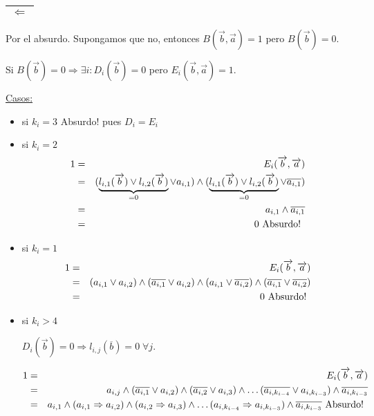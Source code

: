 \documentclass[12pt,a4paper]{report}
\begin{document}
			\vspace{5mm}
			\begin{tabular}{|c|} \hline $\Leftarrow$ \\\hline \end{tabular}
				\par Por el absurdo. Supongamos que no, entonces $B(\overrightarrow{b}, \overrightarrow{a}) = 1$ pero $B(\overrightarrow{b}) = 0$.
				\par Si $B(\overrightarrow{b}) = 0 \Rightarrow \exists i : D_{i}(\overrightarrow{b}) = 0$ pero $E_{i}(\overrightarrow{b}, \overrightarrow{a}) = 1$.

				\vspace{3mm}
				\underline{Casos:}
					\begin{itemize}
						\item si $k_{i} = 3$ Absurdo! pues $D_{i} = E_{i}$
						\item si $k_{i} = 2$
							\begin{eqnarray}
								\nonumber 1 &=& E_{i}(\overrightarrow{b}, \overrightarrow{a}) \\
								\nonumber &=& (\underbrace{l_{i, 1}(\overrightarrow{b}) \vee l_{i, 2}(\overrightarrow{b})}_{= 0} \vee a_{i, 1}) \wedge (\underbrace{l_{i, 1}(\overrightarrow{b}) \vee l_{i, 2}(\overrightarrow{b})}_{= 0} \vee \overline{a_{i, 1}}) \\
								\nonumber &=& a_{i, 1} \wedge \overline{a_{i, 1}} \\
								\nonumber &=& 0 \textup{ Absurdo! }
							\end{eqnarray}
						\item si $k_{i} = 1$
							\begin{eqnarray}
								\nonumber 1 &=& E_{i}(\overrightarrow{b}, \overrightarrow{a}) \\
								\nonumber &=& (a_{i, 1} \vee a_{i, 2}) \wedge (\overline{a_{i, 1}} \vee a_{i, 2}) \wedge (a_{i, 1} \vee \overline{a_{i, 2}}) \wedge (\overline{a_{i, 1}} \vee \overline{a_{i, 2}}) \\
								\nonumber &=& 0 \textup{ Absurdo! }
							\end{eqnarray}
						\item si $k_{i} > 4$

							$D_{i}(\overrightarrow{b}) = 0 \Rightarrow l_{i, j}(\overline{b}) = 0 \; \forall j$.

							\begin{eqnarray}
								\nonumber 1 &=& E_{i}(\overrightarrow{b}, \overrightarrow{a}) \\
								\nonumber &=& a_{i, j} \wedge (\overline{a_{i, 1}} \vee a_{i, 2}) \wedge (\overline{a_{i, 2}} \vee a_{i, 3}) \wedge \dotsc  	(\overline{a_{i, k_{i-4}}} \vee a_{i, k_{i-3}}) \wedge \overline{a_{i, k_{i-3}}} \\
								\nonumber &=& a_{i, 1} \wedge (a_{i, 1} \Rightarrow a_{i, 2}) \wedge (a_{i, 2}\Rightarrow a_{i, 3}) \wedge 	\dotsc (a_{i, k_{i-4}} \Rightarrow a_{i, k_{i-3}}) \wedge \overline{a_{i, k_{i-3}}} \textup{ Absurdo! }
							\end{eqnarray}


\end{itemize}
\end{document}
